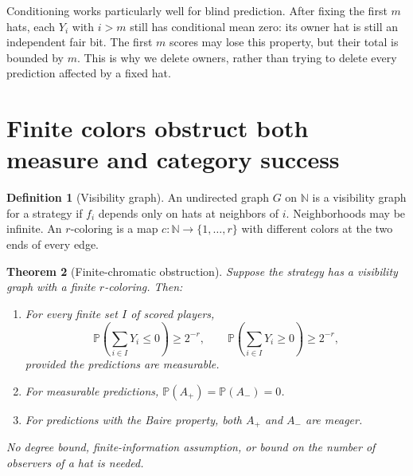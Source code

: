 \documentclass[11pt,letterpaper]{article}
\newtheorem{theorem}{Theorem}[section]
\theoremstyle{definition}
\newtheorem{definition}[theorem]{Definition}
\newcommand{\N}{\mathbb N}
\newcommand{\Prb}{\mathbb P}
\begin{document}
Conditioning works particularly well for blind prediction. After fixing
the first \(m\) hats, each \(Y_i\) with \(i>m\) still has conditional mean
zero: its owner hat is still an independent fair bit. The first \(m\)
scores may lose this property, but their total is bounded by \(m\).
This is why we delete owners, rather than trying to delete every
prediction affected by a fixed hat.

\section{Finite colors obstruct both measure and category success}
\label{mbg:qry:sec:colors}

\begin{definition}[Visibility graph]
An undirected graph \(G\) on \(\N\) is a visibility graph for a strategy
if \(f_i\) depends only on hats at neighbors of \(i\). Neighborhoods may
be infinite. An \(r\)-coloring is a map
\(c:\N\to\{1,\ldots,r\}\) with different colors at the two ends of every
edge.
\end{definition}

\begin{theorem}[Finite-chromatic obstruction]
\label{mbg:qry:thm:colors}
Suppose the strategy has a visibility graph with a finite \(r\)-coloring.
Then:
\begin{enumerate}[label=(\alph*)]
\item For every finite set \(I\) of scored players,
\[
 \Prb\left(\sum_{i\in I}Y_i\le0\right)\ge2^{-r},
 \qquad
 \Prb\left(\sum_{i\in I}Y_i\ge0\right)\ge2^{-r},
\]
provided the predictions are measurable.
\item For measurable predictions, \(\Prb(A_+)=\Prb(A_-)=0\).
\item For predictions with the Baire property, both \(A_+\) and \(A_-\)
are meager.
\end{enumerate}
No degree bound, finite-information assumption, or bound on the number
of observers of a hat is needed.
\end{theorem}
\end{document}

